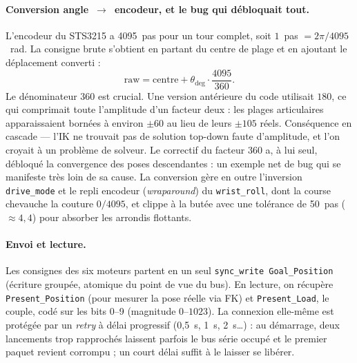 \paragraph{Conversion angle~$\to$~encodeur, et le bug qui débloquait tout.}
L'encodeur du STS3215 a 4095~pas pour un tour complet, soit $1$~pas
$= 2\pi/4095$~rad. La consigne brute s'obtient en partant du centre de plage et
en ajoutant le déplacement converti :
\begin{equation}
  \text{raw} = \text{centre} + \theta_{\deg}\cdot \frac{4095}{360}.
  \label{eq:angle_to_raw}
\end{equation}
Le dénominateur $360$ est crucial. Une version antérieure du code utilisait $180$,
ce qui comprimait toute l'amplitude d'un facteur deux : les plages articulaires
apparaissaient bornées à environ $\pm60$\textdegree{} au lieu de leurs
$\pm105$\textdegree{} réels. Conséquence en cascade — l'IK ne trouvait pas de
solution top-down faute d'amplitude, et l'on croyait à un problème de solveur. Le
correctif du facteur $360$ a, à lui seul, débloqué la convergence des poses
descendantes : un exemple net de bug qui se manifeste très loin de sa cause. La
conversion gère en outre l'inversion \texttt{drive\_mode} et le repli encodeur
(\textit{wraparound}) du \texttt{wrist\_roll}, dont la course chevauche la couture
$0/4095$, et clippe à la butée avec une tolérance de 50~pas ($\approx 4{,}4$\textdegree)
pour absorber les arrondis flottants.

\paragraph{Envoi et lecture.} Les consignes des six moteurs partent en un seul
\texttt{sync\_write Goal\_Position} (écriture groupée, atomique du point de vue du
bus). En lecture, on récupère \texttt{Present\_Position} (pour mesurer la pose
réelle via FK) et \texttt{Present\_Load}, le couple, codé sur les bits 0--9
(magnitude $0$--$1023$). La connexion elle-même est protégée par un \emph{retry}
à délai progressif (0{,}5~s, 1~s, 2~s\ldots) : au démarrage, deux lancements trop
rapprochés laissent parfois le bus série occupé et le premier paquet revient
corrompu ; un court délai suffit à le laisser se libérer.

